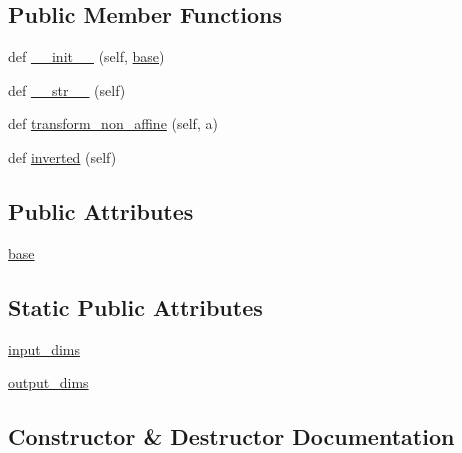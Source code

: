\subsection*{Public Member Functions}
\begin{DoxyCompactItemize}
\item 
def \hyperlink{classmatplotlib_1_1scale_1_1InvertedLogTransform_aaf4ec856785b1fe92cd92c524dbfdba2}{\+\_\+\+\_\+init\+\_\+\+\_\+} (self, \hyperlink{classmatplotlib_1_1scale_1_1InvertedLogTransform_a4c669a690dacbf4cf2b2c8d050586e42}{base})
\item 
def \hyperlink{classmatplotlib_1_1scale_1_1InvertedLogTransform_a9127b98cf8f28ee12d9ec61473dea88c}{\+\_\+\+\_\+str\+\_\+\+\_\+} (self)
\item 
def \hyperlink{classmatplotlib_1_1scale_1_1InvertedLogTransform_a494a0f6a5d32ae22d9b2b4066d436da5}{transform\+\_\+non\+\_\+affine} (self, a)
\item 
def \hyperlink{classmatplotlib_1_1scale_1_1InvertedLogTransform_a3537a8ff5c055f4f1c70b01b490474c9}{inverted} (self)
\end{DoxyCompactItemize}
\subsection*{Public Attributes}
\begin{DoxyCompactItemize}
\item 
\hyperlink{classmatplotlib_1_1scale_1_1InvertedLogTransform_a4c669a690dacbf4cf2b2c8d050586e42}{base}
\end{DoxyCompactItemize}
\subsection*{Static Public Attributes}
\begin{DoxyCompactItemize}
\item 
\hyperlink{classmatplotlib_1_1scale_1_1InvertedLogTransform_a986d5949aa21dff47ac7eef408f33855}{input\+\_\+dims}
\item 
\hyperlink{classmatplotlib_1_1scale_1_1InvertedLogTransform_a1adce13552524b01af88a7dbafa29827}{output\+\_\+dims}
\end{DoxyCompactItemize}


\subsection{Constructor \& Destructor Documentation}
\mbox{\label{classmatplotlib_1_1scale_1_1InvertedLogTransform_aaf4ec856785b1fe92cd92c524dbfdba2}} 
